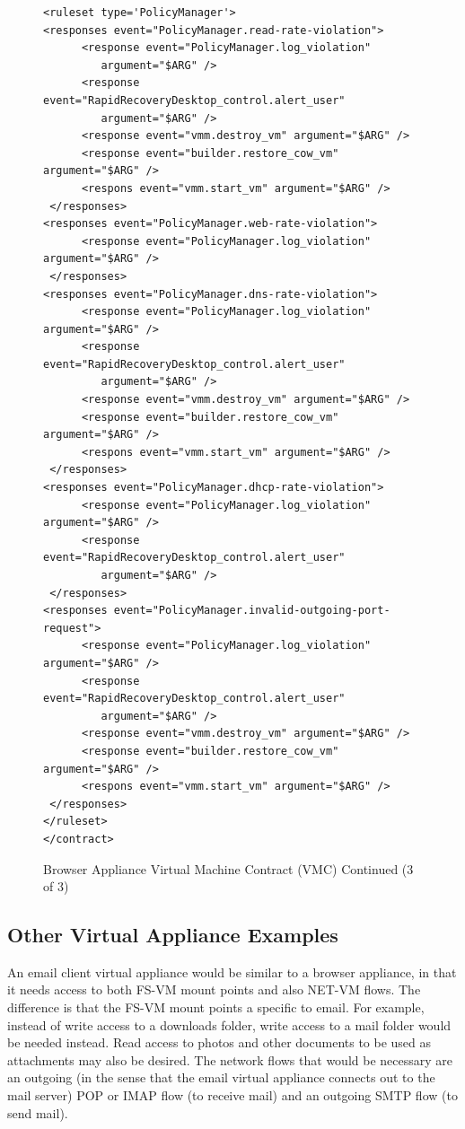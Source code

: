 \begin{figure}[tbp]
\caption{Browser Appliance Virtual Machine Contract (VMC) Continued (3 of 3)}
\label{lst:browser-appliance-cont2}
\begin{lstlisting}
<ruleset type='PolicyManager'>
<responses event="PolicyManager.read-rate-violation">
      <response event="PolicyManager.log_violation" 
         argument="$ARG" />
      <response event="RapidRecoveryDesktop_control.alert_user"
         argument="$ARG" />      
      <response event="vmm.destroy_vm" argument="$ARG" />
      <response event="builder.restore_cow_vm" argument="$ARG" />
      <respons event="vmm.start_vm" argument="$ARG" />
 </responses>
<responses event="PolicyManager.web-rate-violation">
      <response event="PolicyManager.log_violation" argument="$ARG" />
 </responses>
<responses event="PolicyManager.dns-rate-violation">
      <response event="PolicyManager.log_violation" argument="$ARG" />
      <response event="RapidRecoveryDesktop_control.alert_user" 
         argument="$ARG" />      
      <response event="vmm.destroy_vm" argument="$ARG" />
      <response event="builder.restore_cow_vm" argument="$ARG" />
      <respons event="vmm.start_vm" argument="$ARG" />
 </responses>
<responses event="PolicyManager.dhcp-rate-violation">
      <response event="PolicyManager.log_violation" argument="$ARG" />
      <response event="RapidRecoveryDesktop_control.alert_user" 
         argument="$ARG" />      
 </responses>
<responses event="PolicyManager.invalid-outgoing-port-request">
      <response event="PolicyManager.log_violation" argument="$ARG" />
      <response event="RapidRecoveryDesktop_control.alert_user" 
         argument="$ARG" />      
      <response event="vmm.destroy_vm" argument="$ARG" />
      <response event="builder.restore_cow_vm" argument="$ARG" />
      <respons event="vmm.start_vm" argument="$ARG" />
 </responses>
</ruleset>
</contract>
\end{lstlisting}
\end{figure}

\subsection{Other Virtual Appliance Examples}

An email client virtual appliance would be similar to a browser appliance, in that it needs access to both FS-VM mount points and also NET-VM flows. The difference is that the FS-VM mount points a specific to email. For example, instead of write access to a downloads folder, write access to a mail folder would be needed instead. Read access to photos and other documents to be used as attachments may also be desired. The network flows that would be necessary are an outgoing (in the sense that the email virtual appliance connects out to the mail server) POP or IMAP flow (to receive mail) and an outgoing SMTP flow (to send mail).

